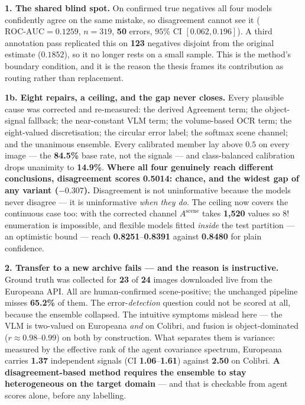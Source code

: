 \documentclass[10pt,a4paper]{article}
\newcommand{\num}[1]{\textbf{#1}}
\begin{document}
\textbf{1. The shared blind spot.} On confirmed true negatives all four models confidently agree on the same mistake, so disagreement cannot see it ($\text{ROC-AUC}=0.1259$, $n=319$, \num{50} errors, $95\%$ CI $[0.062,0.196]$). A third annotation pass replicated this on \num{123} negatives disjoint from the original estimate ($0.1852$), so it no longer rests on a small sample. This is the method's boundary condition, and it is the reason the thesis frames its contribution as routing rather than replacement.

\medskip
\textbf{1b. Eight repairs, a ceiling, and the gap never closes.} Every plausible cause was corrected and re-measured: the derived Agreement term; the object-signal fallback; the near-constant VLM term; the volume-based OCR term; the eight-valued discretisation; the circular error label; the softmax scene channel; and the unanimous ensemble. Every calibrated member lay above $0.5$ on every image --- the \num{84.5\%} base rate, not the signals --- and class-balanced calibration drops unanimity to \num{14.9\%}. \textbf{Where all four genuinely reach different conclusions, disagreement scores \num{0.5014}: chance, and the widest gap of any variant ($-0.307$).} Disagreement is not uninformative because the models never disagree --- it is uninformative \emph{when they do}. The ceiling now covers the continuous case too: with the corrected channel $A^{\text{scene}}$ takes \num{1{,}520} values so $8!$ enumeration is impossible, and flexible models fitted \emph{inside} the test partition --- an optimistic bound --- reach \num{0.8251}--\num{0.8391} against \num{0.8480} for plain confidence.

\medskip
\textbf{2. Transfer to a new archive fails --- and the reason is instructive.} Ground truth was collected for \num{23} of \num{24} images downloaded live from the Europeana API. All are human-confirmed scene-positive; the unchanged pipeline misses \num{65.2\%} of them. The error-\emph{detection} question could not be scored at all, because the ensemble collapsed. The intuitive symptoms mislead here --- the VLM is two-valued on Europeana \emph{and} on Colibri, and fusion is object-dominated ($r\approx0.98$--$0.99$) on both by construction. What separates them is variance: measured by the effective rank of the agent covariance spectrum, Europeana carries \num{1.37} independent signals (CI \num{1.06}--\num{1.61}) against \num{2.50} on Colibri. \textbf{A disagreement-based method requires the ensemble to stay heterogeneous on the target domain} --- and that is checkable from agent scores alone, before any labelling.
\end{document}
